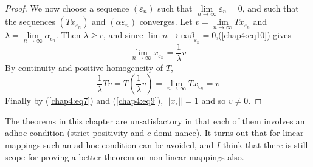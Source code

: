 \begin{proof}
  We now choose a sequence $(\varepsilon_n) $ such that $\lim\limits_{n
    \rightarrow \infty} \varepsilon_n = 0$, and such that the sequences
  $(Tx_{\varepsilon_n}) $ and $(\alpha\varepsilon_n)$ converges. Let $v=
  \lim \limits_{n \rightarrow\infty} Tx_{\varepsilon _n}$ and $ \lambda=
  \lim\limits_{n\rightarrow \infty} \alpha_{\epsilon_n} $. Then $
  \lambda\geq c $, and since   
  $\lim \limits{n \rightarrow\infty} \beta_{\varepsilon_n}=
  0$,\pageoriginale  (\ref{chap4:eq10})  gives
  $$
  \lim\limits_{n \rightarrow \infty} x_{\varepsilon_n}= \frac{1}{\lambda}v
  $$
By continuity and positive homogeneity of $T$,
$$
\frac{1}{\lambda}Tv = T\left(\frac{1}{\lambda}v\right) =  \lim\limits_{n
  \rightarrow \infty} Tx_{\epsilon_n} = v  
$$
Finally by (\ref{chap4:eq7}) and (\ref{chap4:eq9}),  $|| x_\epsilon ||
= 1$ and so $v \neq 0$. 
\end{proof}

\begin{remark*}%
  The theorems in this chapter are unsatisfactory in that each of them
  involves an adhoc condition (strict positivity and $c$-domi-nance). 
  It turns out that for linear mappings such an ad hoc
  condition can be avoided, and $I$ think that there is still scope
  for proving a better theorem on non-linear mappings also.  
\end{remark*}
